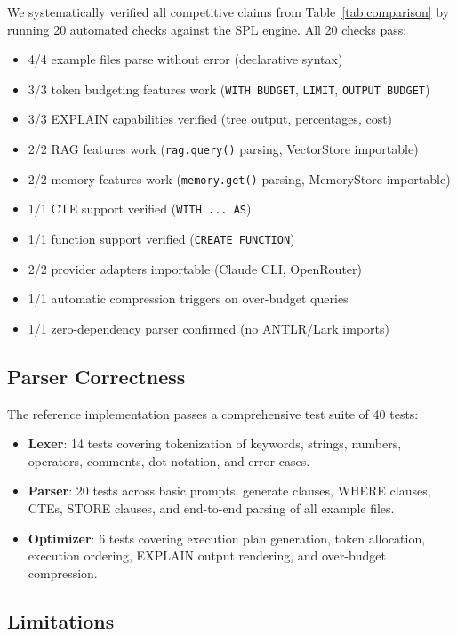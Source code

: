 \documentclass[11pt,a4paper]{article}
\begin{document}
We systematically verified all competitive claims from Table~\ref{tab:comparison} by running 20 automated checks against the SPL engine. All 20 checks pass:

\begin{itemize}[nosep]
  \item 4/4 example files parse without error (declarative syntax)
  \item 3/3 token budgeting features work (\texttt{WITH BUDGET}, \texttt{LIMIT}, \texttt{OUTPUT BUDGET})
  \item 3/3 EXPLAIN capabilities verified (tree output, percentages, cost)
  \item 2/2 RAG features work (\texttt{rag.query()} parsing, VectorStore importable)
  \item 2/2 memory features work (\texttt{memory.get()} parsing, MemoryStore importable)
  \item 1/1 CTE support verified (\texttt{WITH ... AS})
  \item 1/1 function support verified (\texttt{CREATE FUNCTION})
  \item 2/2 provider adapters importable (Claude CLI, OpenRouter)
  \item 1/1 automatic compression triggers on over-budget queries
  \item 1/1 zero-dependency parser confirmed (no ANTLR/Lark imports)
\end{itemize}

\subsection{Parser Correctness}

The reference implementation passes a comprehensive test suite of 40 tests:

\begin{itemize}[nosep]
  \item \textbf{Lexer}: 14 tests covering tokenization of keywords, strings, numbers, operators, comments, dot notation, and error cases.
  \item \textbf{Parser}: 20 tests across basic prompts, generate clauses, WHERE clauses, CTEs, STORE clauses, and end-to-end parsing of all example files.
  \item \textbf{Optimizer}: 6 tests covering execution plan generation, token allocation, execution ordering, EXPLAIN output rendering, and over-budget compression.
\end{itemize}

\subsection{Limitations}
\end{document}
